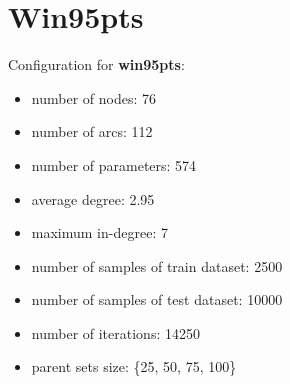 \documentclass[]{scrartcl}
\begin{document}
\clearpage

\section{Win95pts}

Configuration for \textbf{win95pts}:

\begin{itemize}
\item number of nodes: 76
\item number of arcs: 112
\item number of parameters: 574
\item average degree: 2.95
\item maximum in-degree: 7
\item number of samples of train dataset: 2500
\item number of samples of test dataset: 10000
\item number of iterations: 14250
\item parent sets size: \{25, 50, 75, 100\}
\end{itemize}
\end{document}
